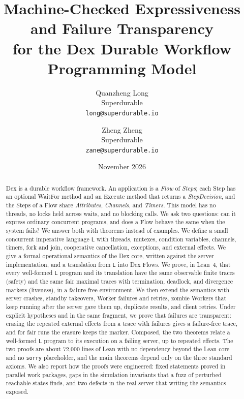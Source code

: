 \documentclass[10pt]{article}
\title{Machine-Checked Expressiveness and Failure Transparency\\
for the Dex Durable Workflow Programming Model}
\author{Quanzheng Long\\[2pt] Superdurable\\[2pt] \texttt{long@superdurable.io}
\and Zheng Zheng\\[2pt] Superdurable\\[2pt] \texttt{zane@superdurable.io}}
\date{November 2026}
\newcommand{\Lang}{\ensuremath{\mathsf{L}}}
\newcommand{\kw}[1]{\textsf{#1}}
\theoremstyle{definition}
\theoremstyle{remark}
\begin{document}
\maketitle

\begin{abstract}
Dex is a durable workflow framework. An application is a \emph{Flow} of
\emph{Steps}; each Step has an optional \kw{WaitFor} method and an
\kw{Execute} method that returns a \emph{StepDecision}, and the Steps of a
Flow share \emph{Attributes}, \emph{Channels}, and \emph{Timers}. This model
has no threads, no locks held across waits, and no blocking calls. We ask
two questions: can it express ordinary concurrent programs, and does a Flow
behave the same when the system fails? We answer both with theorems
instead of examples. We define a small concurrent imperative language
\Lang{} with threads, mutexes, condition variables, channels, timers, fork
and join, cooperative cancellation, exceptions, and external effects. We
give a formal operational semantics of the Dex core, written against the
server implementation, and a translation from \Lang{} into Dex Flows. We
prove, in Lean~4, that every well-formed \Lang{} program and its
translation have the same observable finite traces (safety) and the same
fair maximal traces with termination, deadlock, and divergence markers
(liveness), in a failure-free environment. We then extend the semantics
with server crashes, standby takeovers, Worker failures and retries, zombie
Workers that keep running after the server gave them up, duplicate
results, and client retries. Under explicit hypotheses and in the same
fragment, we prove that failures are transparent: erasing the repeated
external effects from a trace with failures gives a failure-free trace,
and for fair runs the erasure keeps the marker. Composed, the two theorems
relate a well-formed \Lang{} program to its execution on a failing server,
up to repeated effects. The two proofs are about 72,000 lines of Lean with
no dependency beyond the Lean core and no \texttt{sorry} placeholder, and
the main theorems depend only on the three standard axioms. We also report
how the proofs were engineered: fixed statements proved in parallel work
packages, gaps in the simulation invariants that a fuzz of perturbed
reachable states finds, and two defects in the real server that writing
the semantics exposed.
\end{abstract}













{\small
\setlength{\bibsep}{3pt plus 1pt}


}
\end{document}
